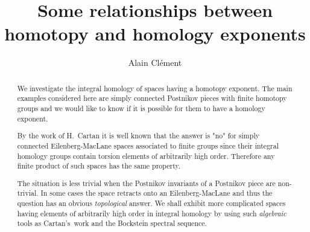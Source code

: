 \documentclass[12pt,a4paper]{article}
\begin{document}
\sloppy

\title{Some relationships between\\ homotopy and homology exponents}
\author{Alain Cl\'ement}
\maketitle

\begin{abstract}
We investigate the integral homology of spaces having a homotopy exponent.
The main examples considered here are simply connected Postnikov pieces with
finite homotopy groups and we would like to know if it is possible for them
to have a homology exponent.

By the work of \mbox{H. Cartan} it is well known that the answer is "no" for
simply connected \mbox{Eilenberg-MacLane} spaces associated to finite groups
since their integral homology groups contain torsion elements of arbitrarily
high order. Therefore any finite product of such spaces has the same
property.

The situation is less trivial when the \mbox{Postnikov} invariants of a
\mbox{Postnikov} piece are non-trivial. In some cases the space retracts
onto an \mbox{Eilenberg-MacLane} and thus the question has an obvious
\mbox{\it topological}  answer. We shall exhibit more complicated spaces
having elements of arbitrarily high order in integral homology by using
such \mbox{\it algebraic} tools as \mbox{Cartan's work} and the Bockstein
spectral sequence.
\end{abstract}
\end{document}
